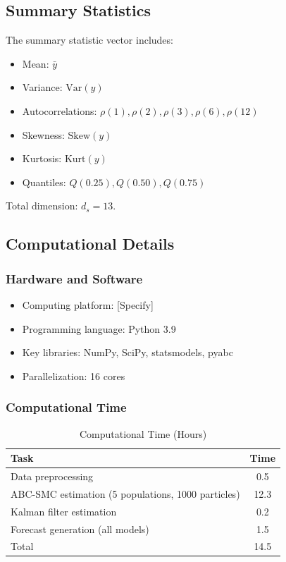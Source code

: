 \subsection{Summary Statistics}

The summary statistic vector includes:
\begin{itemize}
    \item Mean: $\bar{y}$
    \item Variance: $\text{Var}(y)$
    \item Autocorrelations: $\rho(1), \rho(2), \rho(3), \rho(6), \rho(12)$
    \item Skewness: $\text{Skew}(y)$
    \item Kurtosis: $\text{Kurt}(y)$
    \item Quantiles: $Q(0.25), Q(0.50), Q(0.75)$
\end{itemize}

Total dimension: $d_s = 13$.

\subsection{Computational Details}

\subsubsection{Hardware and Software}

\begin{itemize}
    \item Computing platform: [Specify]
    \item Programming language: Python 3.9
    \item Key libraries: NumPy, SciPy, statsmodels, pyabc
    \item Parallelization: 16 cores
\end{itemize}

\subsubsection{Computational Time}

\begin{table}[h]
\centering
\caption{Computational Time (Hours)}
\begin{tabular}{lc}
\toprule
Task & Time \\
\midrule
Data preprocessing & 0.5 \\
ABC-SMC estimation (5 populations, 1000 particles) & 12.3 \\
Kalman filter estimation & 0.2 \\
Forecast generation (all models) & 1.5 \\
Total & 14.5 \\
\bottomrule
\end{tabular}
\end{table}

